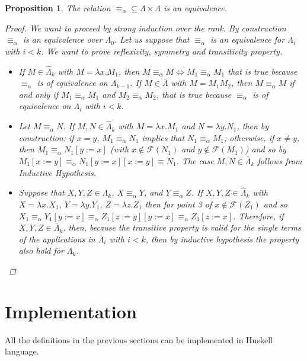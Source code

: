 \documentclass[a4paper,11pt]{article}
\newtheorem{prop}{Proposition}
\theoremstyle{definition}
\newcommand{\FF}{\mathcal{F}}
\begin{document}
\begin{prop}
  The relation $\equiv_\alpha \subseteq \Lambda\times\Lambda$ is an
  equivalence.
  \begin{proof}
    We want to proceed by strong induction over the rank.
    By construction $\equiv_\alpha$ is an equivalence over $\Lambda_0$. Let
    us suppose that $\equiv_\alpha$ is an equivalence for $\Lambda_i$ with
    $i<k$. We want to prove \textit{reflexivity, symmetry and transitivity} property.
    \begin{itemize}
      \item[Reflex.] If $M\in\hat\Lambda_k$ with $M=\lambda x.M_1$, then
        $M\equiv_\alpha M\iff M_1\equiv_\alpha M_1$ that is true because
        $\equiv_\alpha$ is of equivalence on $\Lambda_{k-1}$. If
        $M\in\bar\Lambda$ with $M=M_1M_2$, then $M\equiv_\alpha M$ if and only 
        if $M_1\equiv_\alpha M_1$ and $M_2\equiv_\alpha M_2$, that is true 
        because $\equiv_\alpha$ is of equivalence on $\Lambda_i$ with $i<k$. 
      \item[Symmet.]
        Let $M\equiv_\alpha N$. If $M,N\in\hat\Lambda_k$ with $M=\lambda x.M_1$
        and $N=\lambda y.N_1$, then by construction: if $x=y$, $M_1\equiv_\alpha
        N_1$ implies that $N_1\equiv_\alpha M_1$; otherwise, if $x\ne y$,
        then $M_1\equiv_\alpha N_1[y:=x]$ (with $x\not\in\FF(N_1)$ and
        $y\not\in\FF(M_1)$) and so by  $M_1[x:=y]\equiv_\alpha 
        N_1[y:=x][x:=y]\equiv N_1$. The case $M,N\in\bar\Lambda_k$ follows
        from Inductive Hypothesis.
      \item [Trans.] Suppose that $X,Y,Z\in\Lambda_k$, $X \equiv_\alpha Y$,
        and $Y\equiv_\alpha Z$. If $X,Y,Z\in\hat\Lambda_k$ with 
        $X=\lambda x.X_1$, $Y=\lambda y.Y_1$, $Z=\lambda z.Z_1$ then for
        point 3 of  $x\not\in\FF(Z_1)$ and so
        $X_1\equiv_\alpha Y_1[y:=x]\equiv_\alpha Z_1[z:=y][y:=x]\equiv_\alpha
        Z_1[z:=x]$. Therefore, if $X,Y,Z\in\bar\Lambda_k$, then, because 
        the transitive property is valid for the single terms of the
        applications in $\bar\Lambda_i$ with $i<k$, then by inductive
        hypothesis the property also hold for $\Lambda_k$.
    \end{itemize}
  \end{proof}
\end{prop}

\section{Implementation}
All the definitions in the previous sections can be implemented in Huskell
language. 
\end{document}
